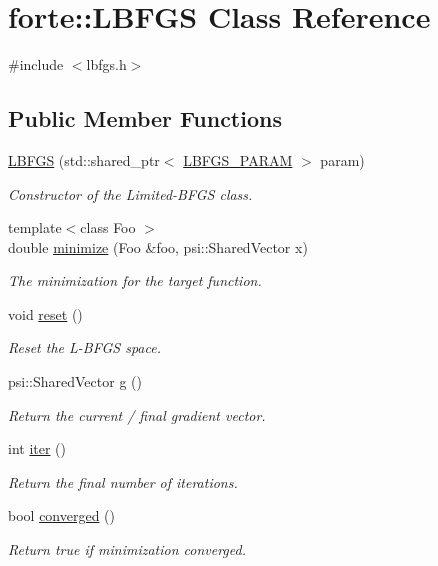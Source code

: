 \hypertarget{classforte_1_1_l_b_f_g_s}{}\section{forte\+:\+:L\+B\+F\+GS Class Reference}
\label{classforte_1_1_l_b_f_g_s}


{\ttfamily \#include $<$lbfgs.\+h$>$}

\subsection*{Public Member Functions}
\begin{DoxyCompactItemize}
\item 
\mbox{\hyperlink{classforte_1_1_l_b_f_g_s_ad3372e79915de6ac76aa5367a3d744e6}{L\+B\+F\+GS}} (std\+::shared\+\_\+ptr$<$ \mbox{\hyperlink{classforte_1_1_l_b_f_g_s___p_a_r_a_m}{L\+B\+F\+G\+S\+\_\+\+P\+A\+R\+AM}} $>$ param)
\begin{DoxyCompactList}\small\item\em Constructor of the Limited-\/\+B\+F\+GS class. \end{DoxyCompactList}\item 
{\footnotesize template$<$class Foo $>$ }\\double \mbox{\hyperlink{classforte_1_1_l_b_f_g_s_a2e1e9e0d39664cb70a631317d3eeea09}{minimize}} (Foo \&foo, psi\+::\+Shared\+Vector x)
\begin{DoxyCompactList}\small\item\em The minimization for the target function. \end{DoxyCompactList}\item 
void \mbox{\hyperlink{classforte_1_1_l_b_f_g_s_ae1925cb32a7963640d6f0b07d4a4e8c0}{reset}} ()
\begin{DoxyCompactList}\small\item\em Reset the L-\/\+B\+F\+GS space. \end{DoxyCompactList}\item 
psi\+::\+Shared\+Vector \mbox{\hyperlink{classforte_1_1_l_b_f_g_s_ac92f946ad0a620b0fef33b96619b0b75}{g}} ()
\begin{DoxyCompactList}\small\item\em Return the current / final gradient vector. \end{DoxyCompactList}\item 
int \mbox{\hyperlink{classforte_1_1_l_b_f_g_s_a90ca8b4968b604d3215c0ea4ce6275d4}{iter}} ()
\begin{DoxyCompactList}\small\item\em Return the final number of iterations. \end{DoxyCompactList}\item 
bool \mbox{\hyperlink{classforte_1_1_l_b_f_g_s_ab42bf7fe9e2a7eafd004773f9b606b65}{converged}} ()
\begin{DoxyCompactList}\small\item\em Return true if minimization converged. \end{DoxyCompactList}\end{DoxyCompactItemize}


